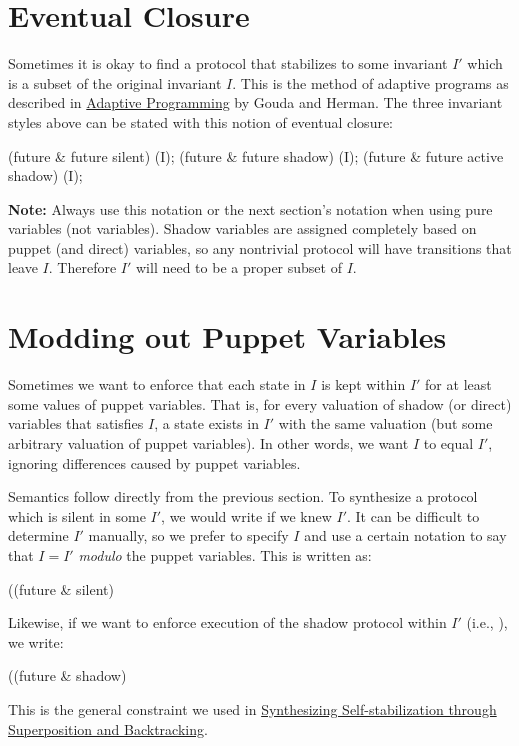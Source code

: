 \section{Eventual Closure}

Sometimes it is okay to find a protocol that stabilizes to some invariant $I'$ which is a subset of the original invariant $I$.
This is the method of adaptive programs as described in \href{http://dx.doi.org/10.1109/32.92911}{Adaptive Programming} by Gouda and Herman.
The three invariant styles above can be stated with this notion of eventual closure:
\begin{code}
(future & future silent) (I);
(future & future shadow) (I);
(future & future active shadow) (I);
\end{code}

\textbf{Note:} Always use this notation or the next section's notation when using pure  variables (not  variables).
Shadow variables are assigned completely based on puppet (and direct) variables, so any nontrivial protocol will have transitions that leave $I$.
Therefore $I'$ will need to be a proper subset of $I$.


\section{Modding out Puppet Variables}

Sometimes we want to enforce that each state in $I$ is kept within $I'$ for at least some values of puppet variables.
That is, for every valuation of shadow (or direct) variables that satisfies $I$, a state exists in $I'$ with the same valuation (but some arbitrary valuation of puppet variables).
In other words, we want $I$ to equal $I'$, ignoring differences caused by puppet variables.

Semantics follow directly from the previous section.
To synthesize a protocol which is silent in some $I'$, we would write  if we knew $I'$.
It can be difficult to determine $I'$ manually, so we prefer to specify $I$ and use a certain notation to say that $I=I'$ \textit{modulo} the puppet variables.
This is written as:
\begin{code}
((future & silent) %
\end{code}

Likewise, if we want to enforce execution of the shadow protocol within $I'$ (i.e., ), we write:
\begin{code}
((future & shadow) %
\end{code}
This is the general constraint we used in \href{http://dx.doi.org/10.1007/978-3-319-11764-5_18}{Synthesizing Self-stabilization through Superposition and Backtracking}.

